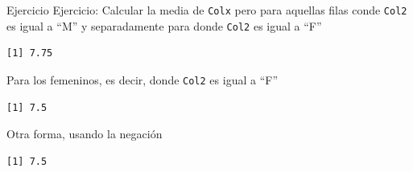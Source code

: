 \documentclass[
  ignorenonframetext,
  aspectratio=169,
  spanish,
]{beamer}
\newenvironment{Shaded}{\begin{snugshade}}{\end{snugshade}}
\newcommand{\FunctionTok}[1]{\textcolor[rgb]{0.28,0.35,0.67}{#1}}
\newcommand{\NormalTok}[1]{\textcolor[rgb]{0.00,0.23,0.31}{#1}}
\newcommand{\OtherTok}[1]{\textcolor[rgb]{0.00,0.23,0.31}{#1}}
\newcommand{\SpecialCharTok}[1]{\textcolor[rgb]{0.37,0.37,0.37}{#1}}
\newcommand{\StringTok}[1]{\textcolor[rgb]{0.13,0.47,0.30}{#1}}
\begin{document}
\begin{frame}[fragile]{Ejercicio}
\label{ejercicio}
Ejercicio: Calcular la media de \texttt{Colx} pero para aquellas filas
conde \texttt{Col2} es igual a ``M'' y separadamente para donde
\texttt{Col2} es igual a ``F''

\begin{Shaded}
\end{Shaded}

\begin{verbatim}
[1] 7.75
\end{verbatim}

Para los femeninos, es decir, donde \texttt{Col2} es igual a ``F''

\begin{Shaded}
\end{Shaded}

\begin{verbatim}
[1] 7.5
\end{verbatim}
\end{frame}

\begin{frame}[fragile]{Otra forma, usando la negación}
\label{otra-forma-usando-la-negaciuxf3n}
\begin{Shaded}
\end{Shaded}

\begin{verbatim}
[1] 7.5
\end{verbatim}
\end{frame}
\end{document}
